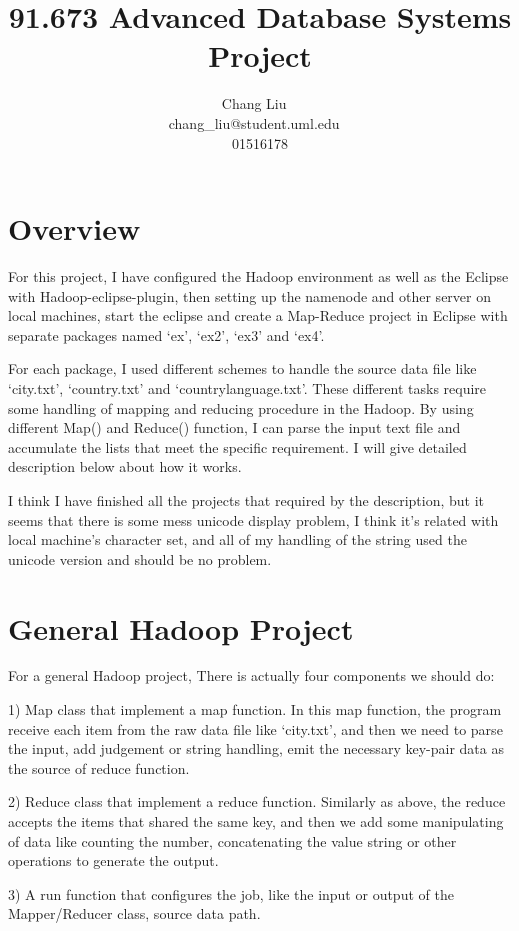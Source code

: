 \documentclass{article}
\author{Chang Liu ~\\ chang\_liu@student.uml.edu ~\\ 01516178}
\title{91.673 Advanced Database Systems Project}
\begin{document}
\maketitle

\section{Overview}

For this project, I have configured the Hadoop environment as well as the Eclipse with Hadoop-eclipse-plugin, then setting up the namenode and other server on local machines, start the eclipse and create a Map-Reduce project in Eclipse with separate packages named `ex', `ex2', `ex3' and `ex4'.

For each package, I used different schemes to handle the source data file like `city.txt', `country.txt' and `countrylanguage.txt'. These different tasks require some handling of mapping and reducing procedure in the Hadoop. By using different Map() and Reduce() function, I can parse the input text file and accumulate the lists that meet the specific requirement. I will give detailed description below about how it works.

I think I have finished all the projects that required by the description, but it seems that there is some mess unicode display problem, I think it's related with local machine's character set, and all of my handling of the string used the unicode version and should be no problem.

\section{General Hadoop Project}

For a general Hadoop project, There is actually four components we should do:

1) Map class that implement a map function. In this map function, the program receive each item from the raw data file like `city.txt', and then we need to parse the input, add judgement or string handling, emit the necessary key-pair data as the source of reduce function.

2) Reduce class that implement a reduce function. Similarly as above, the reduce accepts the items that shared the same key, and then we add some manipulating of data like counting the number, concatenating the value string or other operations to generate the output.

3) A run function that configures the job, like the input or output of the Mapper/Reducer class, source data path.
\end{document}
